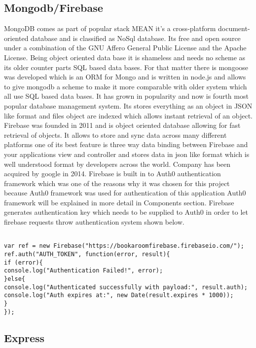 \subsection{Mongodb/Firebase}
\bigbreak
MongoDB comes as part of popular stack MEAN it’s a cross-platform document-oriented database and is classified as NoSql database. Its free and open source under a combination of the GNU Affero General Public License and the Apache License. Being object oriented data base it is shameless and needs no scheme as its older counter parts SQL based data bases. For that matter there is mongoose was developed which is an ORM for Mongo and is written in node.js and allows to give mongodb a scheme to make it more comparable with older system which all use SQL based data bases. It has grown in popularity and now is fourth most popular database management system. Its stores everything as an object in JSON like format and files object are indexed which allows instant retrieval of an object. 
\\
\bigbreak
Firebase was founded in 2011 and is object oriented database allowing for fast retrieval of objects. It allows to store and sync data across many different platforms one of its best feature is three way data binding between Firebase and your applications view and controller and stores data in json like format which is well understood format by developers across the world. Company has been acquired by google in 2014. Firebase is built in to Auth0 authentication framework which was one of the reasons why it was chosen for this project because Auth0 framework was used for authentication of this application Auth0 framework will be explained in more detail in Components section. Firebase generates authentication key which needs to be supplied to Auth0 in order to let firebase requests throw authentication system shown below.
\begin{verbatim}

var ref = new Firebase("https://bookaroomfirebase.firebaseio.com/");
ref.auth("AUTH_TOKEN", function(error, result){
if (error){
console.log("Authentication Failed!", error);
}else{
console.log("Authenticated successfully with payload:", result.auth);
console.log("Auth expires at:", new Date(result.expires * 1000));
}
});

\end{verbatim}


\subsection{Express}
